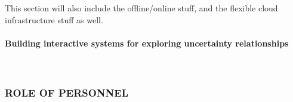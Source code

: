 \documentclass[a4paper,fontsize=12pt]{scrartcl}
\begin{document}


This section will also include the offline/online stuff, and the
flexible cloud infrastructure stuff as well.

\paragraph*{Building interactive systems for exploring uncertainty relationships}\mbox{}\\



\subsubsection*{ROLE OF PERSONNEL}
\end{document}
